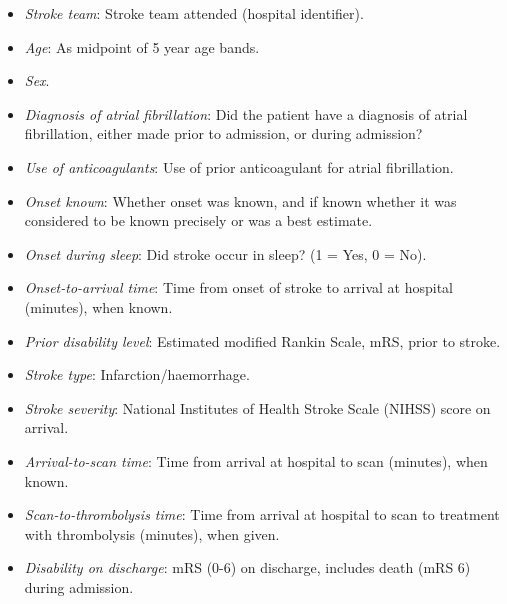 \begin{itemize}

    \item \textit{Stroke team}: Stroke team attended (hospital identifier).

    \item \textit{Age}: As midpoint of 5 year age bands.

    \item \textit{Sex}.

    \item \textit{Diagnosis of atrial fibrillation}: Did the patient have a diagnosis of atrial fibrillation, either made prior to admission, or during admission?

    \item \textit{Use of anticoagulants}: Use of prior anticoagulant for atrial fibrillation.

    \item \textit{Onset known}: Whether onset was known, and if known whether it was considered to be known precisely or was a best estimate.

    \item \textit{Onset during sleep}: Did stroke occur in sleep? (1 = Yes, 0 = No).

    \item \textit{Onset-to-arrival time}: Time from onset of stroke to arrival at hospital (minutes), when known.

    \item \textit{Prior disability level}: Estimated modified Rankin Scale, mRS, prior to stroke.

    \item \textit{Stroke type}: Infarction/haemorrhage.

    \item \textit{Stroke severity}: National Institutes of Health Stroke Scale (NIHSS) score on arrival.

    \item \textit{Arrival-to-scan time}: Time from arrival at hospital to scan (minutes), when known.

    \item \textit{Scan-to-thrombolysis time}: Time from arrival at hospital to scan to treatment with thrombolysis  (minutes), when given.

    \item \textit{Disability on discharge}: mRS (0-6) on discharge, includes death (mRS 6) during admission.
    
\end{itemize}


